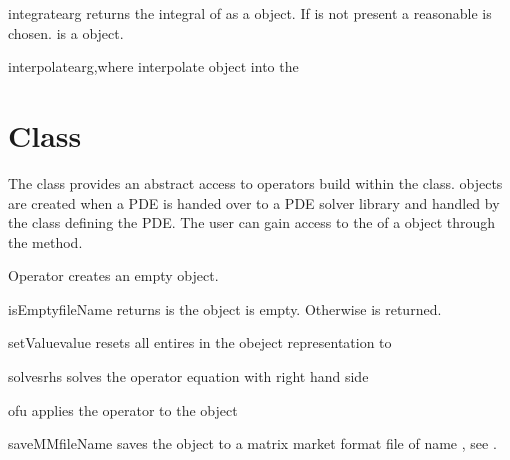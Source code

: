 \begin{funcdesc}{integrate}{arg}
returns the integral of  as a \numarray object.
If  is not present a reasonable \FunctionSpace is chosen.
is a \Data object. 
\end{funcdesc}

\begin{funcdesc}{interpolate}{arg,where}
interpolate \Data object  into the \FunctionSpace {}
\end{funcdesc}


\section{\Operator Class}

The \Operator class provides an abstract access to operators build
within the \LinearPDE class. \Operator objects are created 
when a PDE is handed over to a PDE solver library and handled
by the \LinearPDE class defining the PDE. The user can gain access
to the \Operator of a \LinearPDE object through the 
method.

\begin{classdesc}{Operator}{}
creates an empty \Operator object.
\end{classdesc}

\begin{methoddesc}[Operator]{isEmpty}{fileName}
returns \True is the object is empty. Otherwise \True is returned.
\end{methoddesc}

\begin{methoddesc}[Operator]{setValue}{value}
resets all entires in the obeject representation to 
\end{methoddesc}

\begin{methoddesc}[Operator]{solves}{rhs}
solves the operator equation with right hand side 
\end{methoddesc}

\begin{methoddesc}[Operator]{of}{u}
applies the operator to the \Data object 
\end{methoddesc}

\begin{methoddesc}[Operator]{saveMM}{fileName}
saves the object to a matrix market format file of name
, see
.
\end{methoddesc}

